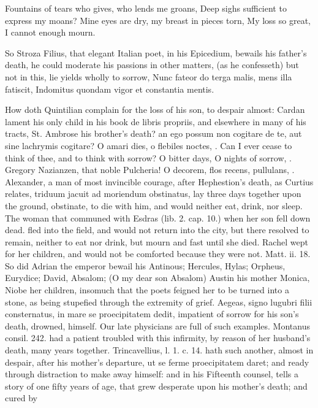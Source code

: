 {Fountains of tears who gives, who lends me groans,
Deep sighs sufficient to express my moans?
Mine eyes are dry, my breast in pieces torn,
My loss so great, I cannot enough mourn.

So Stroza Filius, that elegant Italian poet, in his Epicedium, bewails
his father's death, he could moderate his passions in other matters,
(as he confesseth) but not in this, lie yields wholly to sorrow,
Nunc fateor do terga malis, mens illa fatiscit,
Indomitus quondam vigor et constantia mentis.

How doth Quintilian complain for the loss of his son, to despair
almost: Cardan lament his only child in his book de libris propriis,
and elsewhere in many of his tracts, St. Ambrose his brother's
death? an ego possum non cogitare de te, aut sine lachrymis cogitare? O
amari dies, o flebiles noctes, \etc{}. Can I ever cease to think of thee,
and to think with sorrow? O bitter days, O nights of sorrow, \etc{}.
Gregory Nazianzen, that noble Pulcheria! O decorem, \etc{} flos recens,
pullulans, \etc{}. Alexander, a man of most invincible courage, after
Hephestion's death, as Curtius relates, triduum jacuit ad moriendum
obstinatus, lay three days together upon the ground, obstinate, to die
with him, and would neither eat, drink, nor sleep. The woman that
communed with Esdras (lib. 2. cap. 10.) when her son fell down dead.
fled into the field, and would not return into the city, but there
resolved to remain, neither to eat nor drink, but mourn and fast until
she died. Rachel wept for her children, and would not be comforted
because they were not. Matt. ii. 18. So did Adrian the emperor bewail
his Antinous; Hercules, Hylas; Orpheus, Eurydice; David, Absalom; (O my
dear son Absalom) Austin his mother Monica, Niobe her children,
insomuch that the poets feigned her to be turned into a stone, as
being stupefied through the extremity of grief. Aegeas, signo
lugubri filii consternatus, in mare se proecipitatem dedit, impatient
of sorrow for his son's death, drowned, himself. Our late physicians
are full of such examples. Montanus consil. 242. had a patient
troubled with this infirmity, by reason of her husband's death, many
years together. Trincavellius, l. 1. c. 14. hath such another, almost
in despair, after his mother's departure, ut se ferme
proecipitatem daret; and ready through distraction to make away
himself: and in his Fifteenth counsel, tells a story of one fifty years
of age, that grew desperate upon his mother's death; and cured by
}
